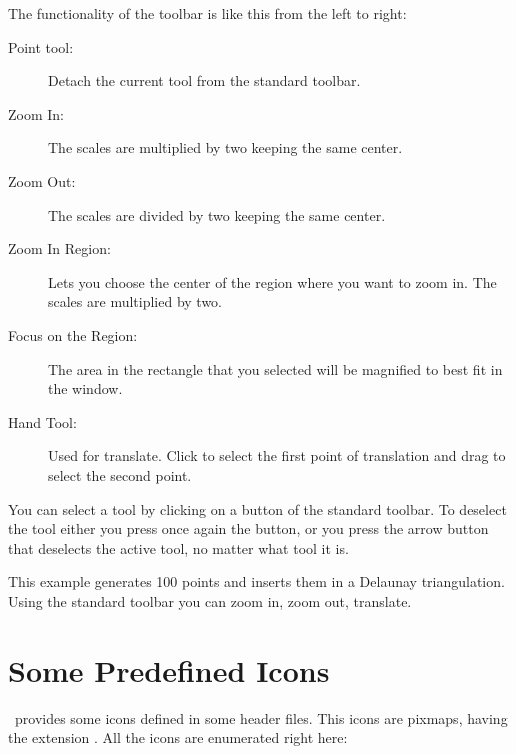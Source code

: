 The functionality of the toolbar is like this from the left to right:
\begin{description}
	\item[Point tool:] Detach the current tool from the standard toolbar.

	\item[Zoom In:] The scales are multiplied by two keeping the same center.

	\item[Zoom Out:] The scales are divided by two keeping the same center.

	\item[Zoom In Region:] Lets you choose the center of the region where you want to zoom in. 
           The scales are multiplied by two.

	\item[Focus on the Region:] The area in the rectangle that you selected will be magnified to 
           best fit in the window.

	\item[Hand Tool:] Used for translate. Click to select the first point of translation and 
           drag to select the second point.
\end{description}

You can select a tool by clicking on a button of the standard
toolbar. To deselect the tool either you press once again the
button, or you press the arrow button that deselects the active tool,
no matter what tool it is.

\ccExample
{}

This example generates 100 points and inserts them in a Delaunay
triangulation. Using the standard toolbar you can zoom in, zoom out,
translate.

\section{Some Predefined Icons}
\label{The predefined icons}

\cgal\ provides some icons defined in some header files. This icons are
pixmaps, having the extension . All the icons are enumerated right
here:




